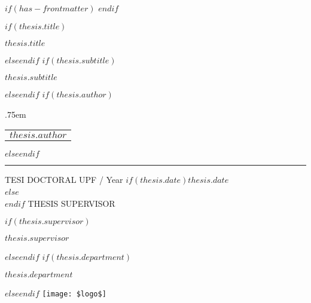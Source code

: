 $if(has-frontmatter)$
\frontmatter
$endif$


\begin{titlepage}
  \begin{spacing}{1}
    \null\vfil
    \begin{flushleft}%
      $if(thesis.title)${\LARGE \sffamily $thesis.title$ \par}$else${\vskip 1cm}$endif$
      \vspace*{1cm}
      $if(thesis.subtitle)${\Large\sffamily $thesis.subtitle$ \par}$else${\vskip 1cm}$endif$
      \vskip 2cm%
      $if(thesis.author)${\large \lineskip .75em \begin{tabular}[t]{c} {\Huge $thesis.author$} \end{tabular}\par}$else${\vskip 1cm}$endif$
      \rule{\linewidth}{1mm} \par
      \vskip 1cm%
      {\large TESI DOCTORAL UPF / Year $if(thesis.date)$$thesis.date$\\[2cm]}$else${\vskip 1cm \\[2cm]}$endif$
      {\normalsize THESIS SUPERVISOR}\par
      $if(thesis.supervisor)${\large $thesis.supervisor$\par}$else${\vskip 1cm}$endif$
      $if(thesis.department)${\large $thesis.department$\par}$else${\vskip 1cm}$endif$
      \vspace{2cm}
      \centering
      \texttt{[image: \$logo\$]}
    \end{flushleft}\par
    \afterpage{\blankpage}
  \end{spacing}
\end{titlepage}
\newpage


